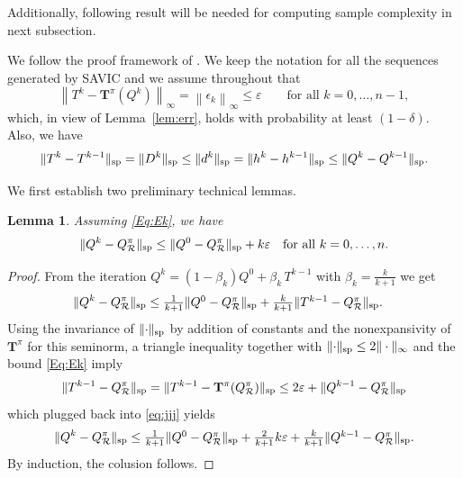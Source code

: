 \documentclass{article}
\newtheorem{lemma}[theorem]{Lemma}
\theoremstyle{definition}
\theoremstyle{remark}
\newcommand{\cR}{\mathcal{R}}
\newcommand{\T}{\mathbf{T}}
\newcommand*{\infn}[1]{\left\|{#1}\right\|_{\infty}}
\renewcommand{\sp}[1]{\|{#1}\|_\text{\rm sp}}
\begin{document}
Additionally, following result will be needed for computing sample complexity in next subsection.
 
 We follow the proof framework of \citep{lee2025near}. We keep the notation for all the sequences
generated by SAVIC and
we assume throughout that
\begin{equation}\label{Eq:Ek}
\infn{T^k-\T^\pi(Q^{k})} =\infn{\epsilon_k}\le \varepsilon\qquad \text{for all} \,\, k=0,\ldots,n-1,
\end{equation}
which, in view of Lemma~\ref{lem:err}, holds with probability at least $(1-\delta)$.
Also, we have 
\begin{equation}\label{Eq:spk}\sp{T^k-T^{k-1}}=\sp{D^k} \le \sp{d^k}=\sp{h^k-h^{k-1}}\le \sp{Q^{k}-Q^{k-1}}.
\end{equation}

We first establish two preliminary technical lemmas. 
\begin{lemma}\label{Le:uno}Assuming \eqref{Eq:Ek}, we have  $$\sp{Q^k-Q^\pi_\cR}\leq \sp{Q^0-Q^\pi_\cR}+ k \varepsilon \quad \text{for all} \,\, k=0,\ldots,n.$$ 
\end{lemma}
\begin{proof} From the iteration $Q^{k}=(1-\beta_k)Q^0+\beta_k\,T^{k-1}$ with $\beta_k=\frac{k}{k+1}$ we get
\begin{align}\label{eq:jjj}
    \sp{Q^{k}-Q^\pi_\cR}&\le \mbox{$\frac{1}{k+1}\sp{Q^0-Q^\pi_\cR}+\frac{k}{k+1}\sp{T^{k-1}-Q^\pi_\cR}$}.
\end{align}
Using the invariance of $\sp{\cdot}$ by addition of constants and the nonexpansivity of $\T^\pi$ for this seminorm, a triangle inequality together with $\sp{\cdot}\leq 2\|\cdot\|_\infty$ and the bound \eqref{Eq:Ek} imply
\begin{equation*}\label{Eq:cit}
    \sp{T^{k-1}-Q^\pi_\cR}=\sp{T^{k-1}-\T^\pi(Q^\pi_\cR)}\le 2\varepsilon+\sp{Q^{k-1}-Q^\pi_\cR}
\end{equation*}
which plugged back into \eqref{eq:jjj} yields
$$
\sp{Q^{k}-Q^\pi_\cR}\le \mbox{$\frac{1}{k+1}\sp{Q^0-Q^\pi_\cR}+\frac{2}{k+1}k\varepsilon+\frac{k}{k+1}\sp{Q^{k-1}-Q^\pi_\cR}$}.$$
By induction, the colusion follows.
\end{proof}

\vspace{2ex}
\end{document}

